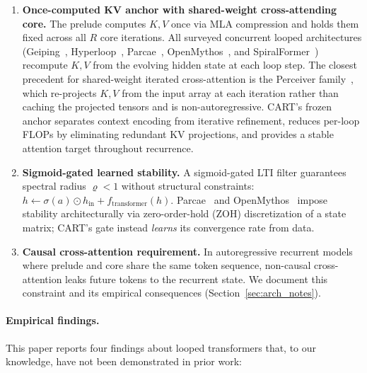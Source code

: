 \documentclass{article}
\newcommand{\cart}{\textsc{CART}}
\begin{document}
\begin{enumerate}[leftmargin=*, topsep=2pt, itemsep=1pt]
  \item \textbf{Once-computed KV anchor with shared-weight cross-attending core.} The prelude computes $K, V$ once via MLA compression and holds them fixed across all $R$ core iterations. All surveyed concurrent looped architectures (Geiping~\citep{geiping2025latent}, Hyperloop~\citep{zeitoun2026hyperloop}, Parcae~\citep{prairie2026parcae}, OpenMythos~\citep{gomez2026openmythos}, and SpiralFormer~\citep{spiralformer2026}) recompute $K, V$ from the evolving hidden state at each loop step. The closest precedent for shared-weight iterated cross-attention is the Perceiver family~\citep{jaegle2021perceiver,jaegle2022perceiverio}, which re-projects $K, V$ from the input array at each iteration rather than caching the projected tensors and is non-autoregressive. \cart{}'s frozen anchor separates context encoding from iterative refinement, reduces per-loop FLOPs by eliminating redundant KV projections, and provides a stable attention target throughout recurrence.
  \item \textbf{Sigmoid-gated learned stability.} A sigmoid-gated LTI filter guarantees spectral radius $\varrho < 1$ without structural constraints: $h \leftarrow \sigma(a) \odot h_\text{in} + f_\text{transformer}(h)$. Parcae~\citep{prairie2026parcae} and OpenMythos~\citep{gomez2026openmythos} impose stability architecturally via zero-order-hold (ZOH) discretization of a state matrix; \cart{}'s gate instead \emph{learns} its convergence rate from data.
  \item \textbf{Causal cross-attention requirement.} In autoregressive recurrent models where prelude and core share the same token sequence, non-causal cross-attention leaks future tokens to the recurrent state. We document this constraint and its empirical consequences (Section~\ref{sec:arch_notes}).
\end{enumerate}

\paragraph{Empirical findings.}
This paper reports four findings about looped transformers that, to our knowledge, have not been demonstrated in prior work:
\end{document}
